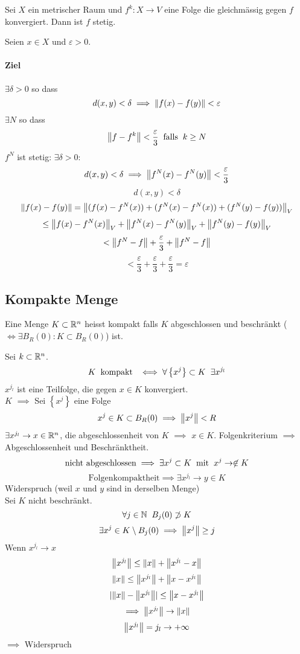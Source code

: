 \begin{Sat}
  Sei $X$ ein metrischer Raum und $f^k:X\to V$ eine Folge die gleichmässig gegen $f$ konvergiert. Dann ist $f$ stetig.
\end{Sat}
\begin{Bew}
  Seien $x\in X$ und $\varepsilon>0$.
  \paragraph{Ziel} $\exists \delta>0$ so dass
  \[d(x,y)<\delta\implies\left\| f(x)-f(y) \right\|<\varepsilon\]
  $\exists N$ so dass
  \[\left\| f-f^k \right\|<\frac{\varepsilon}{3}\hspace{2mm}\text{falls}\hspace{2mm} k\geq N\]
  $f^N$ ist stetig: $\exists \delta>0$:
  \[d(x,y)<\delta\implies \left\| f^N(x)-f^N(y) \right\|<\frac{\varepsilon}{3}\]
  \[d(x,y)<\delta\]
  \[\left\| f(x)-f(y) \right\|=\left\| (f(x)-f^N(x))+(f^N(x)-f^N(x))+(f^N(y)-f(y)) \right\|_V\]
  \[\leq\left\| f(x)-f^N(x) \right\|_V+\left\| f^N(x)-f^N(y) \right\|_V+\left\| f^N(y)-f(y) \right\|_V\]
  \[<\left\| f^N-f \right\|+\frac{\varepsilon}{3}+\left\| f^N-f \right\|\]
  \[<\frac{\varepsilon}{3}+\frac{\varepsilon}{3}+\frac{\varepsilon}{3}=\varepsilon\]
\end{Bew}
\subsection{Kompakte Menge}
\begin{Def}
  Eine Menge $K\subset \mathbb{R}^n$ heisst kompakt falls $K$ abgeschlossen und beschränkt ($\iff \exists B_R(0):K\subset B_R(0)$) ist.
\end{Def}
\begin{Sat}
  Sei $k\subset\mathbb{R}^n$.
  \[K \hspace{2mm}\text{kompakt}\hspace{2mm} \iff\forall \left\{ x^j \right\}\subset K\hspace{2mm}\exists x^{j_l}\]
  $x^{j_l}$ ist eine Teilfolge, die gegen $x\in K$ konvergiert.\\
  $K$ $\implies$ Sei $\left\{ x^j \right\}$ eine Folge
  \[x^j\in K\subset B_R(0)\implies \left\| x^j \right\|<R\]
  $\exists x^{j_l}\to x\in\mathbb{R}^n$, die abgeschlossenheit von $K$ $\implies$ $x\in K$. Folgenkriterium $\implies$ Abgeschlossenheit und Beschränktheit.
  \[\text{nicht abgeschlossen}\implies \exists x^j\subset K\hspace{2mm}\text{mit}\hspace{2mm} x^j\to\not\in K\]
  \[\text{Folgenkompaktheit}\implies \exists x^{j_l}\to y\in K\]
  Widerspruch (weil $x$ und $y$ sind in derselben Menge)\\
  Sei $K$ nicht beschränkt.
  \[\forall j\in\mathbb{N}\hspace{2mm} B_j(0)\not\supset K\]
  \[\exists x^j\in K\setminus B_j(0)\implies \left\| x^j \right\|\geq j\]
  Wenn $x^{j_l}\to x$
  \[\left\| x^{j_l} \right\|\leq \left\| x \right\|+\left\| x^{j_l}-x \right\|\]
  \[\left\| x \right\|\leq\left\| x^{j_l} \right\|+\left\| x-x^{j_l} \right\|\]
  \[\mathopen| \left\| x \right\|-\left\| x^{j_l} \right\| \mathclose|\leq\left\| x-x^{j_l} \right\|\]
  \[\implies\left\| x^{j_l} \right\|\to\left\| x \right\|\]
  \[\left\| x^{j_l} \right\|=j_l\to+\infty\]
  $\implies$ Widerspruch
\end{Sat}
